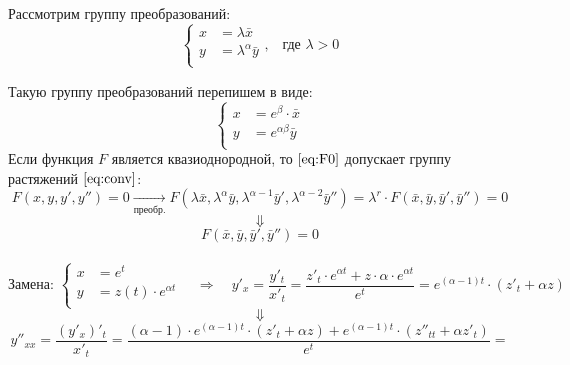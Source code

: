 \begin{corollary}
\begin{enumerate}
            Рассмотрим группу преобразований:
            \begin{equation} \label{eq:conv}
                \left\{
                \begin{aligned} 
                x &= \lambda \bar{x}  \\
                y &= \lambda^{\alpha} \bar{y}\\   
                \end{aligned}
                \right.\text{,}  \quad  \text{где } \lambda > 0                                            
            \end{equation}

            Такую группу преобразований перепишем в виде: 
            \[
                \left\{
                \begin{aligned}
                    x &= e^{\beta} \cdot \bar{x}  \\
                    y &= e^{\alpha \beta} \bar{y} \\   
                \end{aligned}
                \right.                                                          
            \]
            Если функция $F$ является квазиоднородной, то $\eqref{eq:F0}$ допускает группу растяжений $\eqref{eq:conv}$: \\
            \[
                \boxed{F(x, y, y', y'') = 0} \xrightarrow[\text{преобр.}]{} F(\lambda \bar{x}, \lambda^{\alpha} \bar{y}, \lambda^{\alpha - 1} \bar{y}', \lambda^{\alpha - 2} \bar{y}'') = \lambda^{r} \cdot F(\bar{x}, \bar{y}, \bar{y}', \bar{y}'') = 0
            \]
            \[
                \Downarrow
            \]
            \[
                F(\bar{x}, \bar{y}, \bar{y}', \bar{y}'') = 0
            \]
            \ \\
            \[
            \text{Замена: }\left\{
            \begin{aligned}
                x &= e^{t}  \\
                y &= z(t) \cdot e^{\alpha t}\\   
            \end{aligned}
            \right. \quad
            \Rightarrow  \quad y'_x = \frac{y'_t}{x'_t} = \frac{z'_t \cdot e^{\alpha t} +  z \cdot \alpha \cdot e^{\alpha t}}{e^t} =  e^{(\alpha  -  1)t} \cdot (z'_t  + \alpha z)                                              
            \]
            \[
            \Downarrow
            \]
            \[
                y''_{xx} = \frac{(y'_x)'_t}{x'_t} = \frac{(\alpha - 1) \cdot e^{(\alpha - 1)t} \cdot (z'_t + \alpha z) + e^{(\alpha - 1)t} \cdot (z''_{tt} + \alpha z'_t)}{e^t} = 
\]
\end{enumerate}
\end{corollary}
